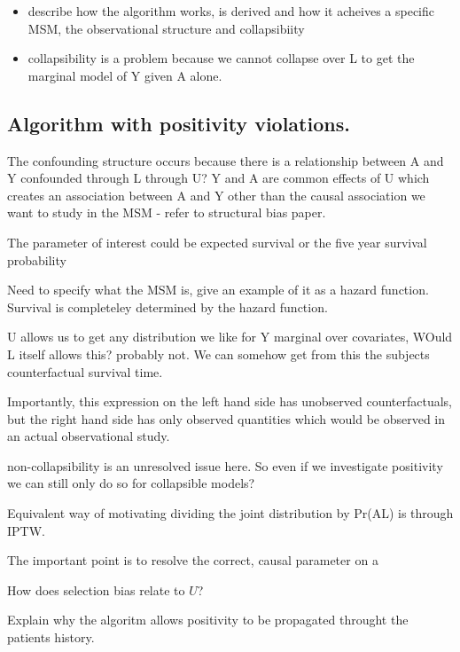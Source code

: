 \documentclass[11pt]{article}
\providecommand{\tightlist}{%
      \setlength{\itemsep}{0pt}\setlength{\parskip}{0pt}}
\begin{document}
\begin{itemize}
\tightlist
\item
  describe how the algorithm works, is derived and how it acheives a
  specific MSM, the observational structure and collapsibiity
\item
  collapsibility is a problem because we cannot collapse over L to get
  the marginal model of Y given A alone.
\end{itemize}

\subsection{Algorithm with positivity
violations.}\label{algorithm-with-positivity-violations.}

The confounding structure occurs because there is a relationship between
A and Y confounded through L through U? Y and A are common effects of U
which creates an association between A and Y other than the causal
association we want to study in the MSM - refer to structural bias
paper.

The parameter of interest could be expected survival or the five year
survival probability

Need to specify what the MSM is, give an example of it as a hazard
function. Survival is completeley determined by the hazard function.

U allows us to get any distribution we like for Y marginal over
covariates, WOuld L itself allows this? probably not. We can somehow get
from this the subjects counterfactual survival time.

Importantly, this expression on the left hand side has unobserved
counterfactuals, but the right hand side has only observed quantities
which would be observed in an actual observational study.

non-collapsibility is an unresolved issue here. So even if we
investigate positivity we can still only do so for collapsible models?

Equivalent way of motivating dividing the joint distribution by
Pr(A\textbar{}L) is through IPTW.

The important point is to resolve the correct, causal parameter on a

How does selection bias relate to \(U\)?

Explain why the algoritm allows positivity to be propagated throught the
patients history.
\end{document}
